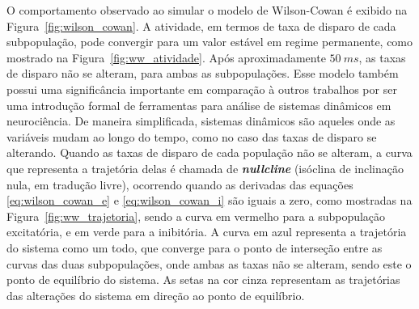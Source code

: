 O comportamento observado ao simular o modelo de Wilson-Cowan é exibido na Figura~\ref{fig:wilson_cowan}. A atividade, em termos de taxa de disparo de cada subpopulação, pode convergir para um valor estável em regime permanente, como mostrado na Figura~\ref{fig:ww_atividade}. Após aproximadamente $50\ ms$, as taxas de disparo não se alteram, para ambas as subpopulações. Esse modelo também possui uma significância importante em comparação à outros trabalhos por ser uma introdução formal de ferramentas para análise de sistemas dinâmicos em neurociência.
De maneira simplificada, sistemas dinâmicos são aqueles onde as variáveis mudam ao longo do tempo, como no caso das taxas de disparo se alterando. Quando as taxas de disparo de cada população não se alteram, a curva que representa a trajetória delas é chamada de \textbf{\textit{nullcline}} (isóclina de inclinação nula, em tradução livre), ocorrendo quando as derivadas das equações \ref{eq:wilson_cowan_e} e \ref{eq:wilson_cowan_i} são iguais a zero, como mostradas na Figura~\ref{fig:ww_trajetoria}, sendo a curva em vermelho para a subpopulação excitatória, e em verde para a inibitória. A curva em azul representa a trajetória do sistema como um todo, que converge para o ponto de interseção entre as curvas das duas subpopulações, onde ambas as taxas não se alteram, sendo este o ponto de equilíbrio do sistema. As setas na cor cinza representam as trajetórias das alterações do sistema em direção ao ponto de equilíbrio.
